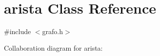 \hypertarget{classarista}{}\section{arista Class Reference}
\label{classarista}


{\ttfamily \#include $<$grafo.\+h$>$}



Collaboration diagram for arista\+:
